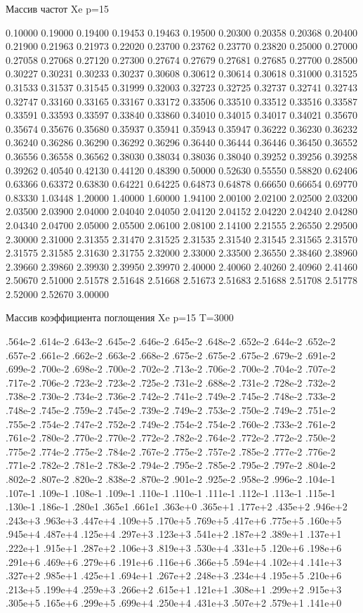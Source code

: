 \noindent Массив частот Xe p=15

 0.10000 0.19000 0.19400 0.19453 0.19463 0.19500 0.20300 0.20358 0.20368 0.20400 0.21900 0.21963 0.21973 0.22020 0.23700 0.23762 0.23770 0.23820 0.25000 0.27000 0.27058 0.27068 0.27120 0.27300 0.27674 0.27679 0.27681 0.27685 0.27700 0.28500 0.30227 0.30231 0.30233 0.30237 0.30608 0.30612 0.30614 0.30618 0.31000 0.31525 0.31533 0.31537 0.31545 0.31999 0.32003 0.32723 0.32725 0.32737 0.32741 0.32743 0.32747 0.33160 0.33165 0.33167 0.33172 0.33506 0.33510 0.33512 0.33516 0.33587 0.33591 0.33593 0.33597 0.33840 0.33860 0.34010 0.34015 0.34017 0.34021 0.35670 0.35674 0.35676 0.35680 0.35937 0.35941 0.35943 0.35947 0.36222 0.36230 0.36232 0.36240 0.36286 0.36290 0.36292 0.36296 0.36440 0.36444 0.36446 0.36450 0.36552 0.36556 0.36558 0.36562 0.38030 0.38034 0.38036 0.38040 0.39252 0.39256 0.39258 0.39262 0.40540 0.42130 0.44120 0.48390 0.50000 0.52630 0.55550 0.58820 0.62406 0.63366 0.63372 0.63830 0.64221 0.64225 0.64873 0.64878 0.66650 0.66654 0.69770 0.83330 1.03448 1.20000 1.40000 1.60000 1.94100 2.00100 2.02100 2.02500 2.03200 2.03500 2.03900 2.04000 2.04040 2.04050 2.04120 2.04152 2.04220 2.04240 2.04280 2.04340 2.04700 2.05000 2.05500 2.06100 2.08100 2.14100 2.21555 2.26550 2.29500 2.30000 2.31000 2.31355 2.31470 2.31525 2.31535 2.31540 2.31545 2.31565 2.31570 2.31575 2.31585 2.31630 2.31755 2.32000 2.33000 2.33500 2.36550 2.38460 2.38960 2.39660 2.39860 2.39930 2.39950 2.39970 2.40000 2.40060 2.40260 2.40960 2.41460 2.50670 2.51000 2.51578 2.51648 2.51668 2.51673 2.51683 2.51688 2.51708 2.51778 2.52000 2.52670 3.00000

\noindent Массив коэффициента поглощения Xe p=15 T=3000

\noindent .564e-2 .614e‑2 .643e‑2 .645e‑2 .646e‑2 .645e‑2 .648e‑2 .652e‑2 .644e‑2 .652e‑2 .657e‑2 .661e‑2 .662e‑2 .663e‑2 .668e‑2 .675e‑2 .675e‑2 .675e‑2 .679e‑2 .691e‑2 .699e‑2 .700e‑2 .698e‑2 .700e‑2 .702e‑2 .713e‑2 .706e‑2 .700e‑2 .704e‑2 .707e‑2 .717e‑2 .706e‑2 .723e‑2 .723e‑2 .725e‑2 .731e‑2 .688e‑2 .731e‑2 .728e‑2 .732e‑2 .738e‑2 .730e‑2 .734e‑2 .736e‑2 .742e‑2 .741e‑2 .749e‑2 .745e‑2 .748e‑2 .733e‑2 .748e‑2 .745e‑2 .759e‑2 .745e‑2 .739e‑2 .749e‑2 .753e‑2 .750e‑2 .749e‑2 .751e‑2 .755e‑2 .754e‑2 .747e‑2 .752e‑2 .749e‑2 .754e‑2 .754e‑2 .760e‑2 .733e‑2 .761e‑2 .761e‑2 .780e‑2 .770e‑2 .770e‑2 .772e‑2 .782e‑2 .764e‑2 .772e‑2 .772e‑2 .750e‑2 .775e‑2 .774e‑2 .775e‑2 .784e‑2 .767e‑2 .775e‑2 .757e‑2 .785e‑2 .777e‑2 .776e‑2 .771e‑2 .782e‑2 .781e‑2 .783e‑2 .794e‑2 .795e‑2 .785e‑2 .795e‑2 .797e‑2 .804e‑2 .802e‑2 .807e‑2 .820e‑2 .838e‑2 .870e‑2 .901e‑2 .925e‑2 .958e‑2 .996e‑2 .104e‑1 .107e‑1 .109e‑1 .108e‑1 .109e‑1 .110e‑1 .110e‑1 .111e‑1 .112e‑1 .113e‑1 .115e‑1 .130e‑1 .186e‑1 .280e1 .365e1 .661e1 .363e+0 .365e+1 .177e+2 .435e+2 .946e+2 .243e+3 .963e+3 .447e+4 .109e+5 .170e+5 .769e+5 .417e+6 .775e+5 .160e+5 .945e+4 .487e+4 .125e+4 .297e+3 .123e+3 .541e+2 .187e+2 .389e+1 .137e+1 .222e+1 .915e+1 .287e+2 .106e+3 .819e+3 .530e+4 .331e+5 .120e+6 .198e+6 .291e+6 .469e+6 .279e+6 .191e+6 .116e+6 .366e+5 .594e+4 .102e+4 .141e+3 .327e+2 .985e+1 .425e+1 .694e+1 .267e+2 .248e+3 .234e+4 .195e+5 .210e+6 .213e+5 .199e+4 .259e+3 .266e+2 .615e+1 .121e+1 .308e+1 .299e+2 .915e+3 .305e+5 .165e+6 .299e+5 .699e+4 .250e+4 .431e+3 .507e+2 .579e+1 .141e+0

